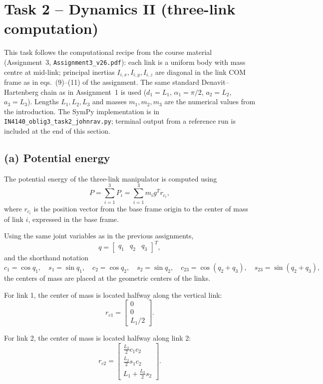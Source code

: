 \documentclass{article}
\begin{document}
\section{Task 2 -- Dynamics II (three-link computation)}

This task follows the computational recipe from the course material (Assignment~3, \texttt{Assignment3\_v26.pdf}): each link is a uniform body with mass centre at mid-link; principal inertias \(I_{i,x},I_{i,y},I_{i,z}\) are diagonal in the link COM frame as in eqs.~(9)--(11) of the assignment. The same standard Denavit--Hartenberg chain as in Assignment~1 is used (\(d_1=L_1\), \(\alpha_1=\pi/2\), \(a_2=L_2\), \(a_3=L_3\)). Lengths \(L_1,L_2,L_3\) and masses \(m_1,m_2,m_3\) are the numerical values from the introduction. The SymPy implementation is in \texttt{IN4140\_oblig3\_task2\_johnrav.py}; terminal output from a reference run is included at the end of this section.

\subsection*{(a) Potential energy}

The potential energy of the three-link manipulator is computed using
\[
P=\sum_{i=1}^{3} P_i=\sum_{i=1}^{3} m_i g^T r_{c_i},
\]
where \(r_{c_i}\) is the position vector from the base frame origin to the center of mass of link \(i\), expressed in the base frame.

Using the same joint variables as in the previous assignments,
\[
q=\begin{bmatrix}q_1 & q_2 & q_3\end{bmatrix}^T,
\]
and the shorthand notation
\[
c_1=\cos q_1,\quad s_1=\sin q_1,\quad
c_2=\cos q_2,\quad s_2=\sin q_2,\quad
c_{23}=\cos(q_2+q_3),\quad s_{23}=\sin(q_2+q_3),
\]
the centers of mass are placed at the geometric centers of the links.

For link 1, the center of mass is located halfway along the vertical link:
\[
r_{c1}=
\begin{bmatrix}
0\\
0\\
L_1/2
\end{bmatrix}.
\]

For link 2, the center of mass is located halfway along link 2:
\[
r_{c2}=
\begin{bmatrix}
\frac{L_2}{2} c_1 c_2\\
\frac{L_2}{2} s_1 c_2\\
L_1+\frac{L_2}{2}s_2
\end{bmatrix}.
\]
\end{document}

